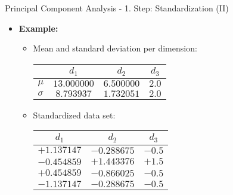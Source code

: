 \begin{frame}{Principal Component Analysis - 1. Step: Standardization (II)}
	\begin{itemize}
		\item \textbf{Example:}
		      \begin{itemize}
			      \item Mean and standard deviation per dimension: \\
			            \vspace{3mm}
			            \begin{center}
				            \centering
				            \begin{tabular}{|l|c|c|c|}
					            \hline
					                     & $d_1$       & $d_2$      & $d_3$ \\
					            \hline
					            $\mu$    & $13.000000$ & $6.500000$ & $2.0$ \\
					            \hline
					            $\sigma$ & $8.793937$  & $1.732051$ & $2.0$ \\
					            \hline
				            \end{tabular}
			            \end{center}
			            \vspace{3mm}
			      \item Standardized data set: \\
			            \vspace{3mm}
			            \begin{center}
				            \centering
				            \begin{tabular}{|c|c|c|}
					            \hline
					            $d_1$       & $d_2$       & $d_3$
					            \\\hline
					            $+1.137147$ & $-0.288675$ & $-0.5$
					            \\\hline
					            $-0.454859$ & $+1.443376$ & $+1.5$
					            \\\hline
					            $+0.454859$ & $-0.866025$ & $-0.5$
					            \\\hline
					            $-1.137147$ & $-0.288675$ & $-0.5$
					            \\\hline
				            \end{tabular}
			            \end{center}
		      \end{itemize}
	\end{itemize}
\end{frame}

